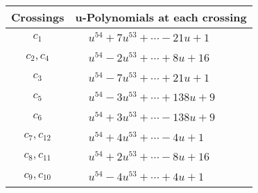 \documentclass[1p]{elsarticle_modified}
\theoremstyle{definition}
\begin{document}
\begin{tabular}{m{50pt}|m{274pt}}
Crossings & \hspace{64pt}u-Polynomials at each crossing \\
\hline $$\begin{aligned}c_{1}\end{aligned}$$&$\begin{aligned}
&u^{54}+7 u^{53}+\cdots-21 u+1
\end{aligned}$\\
\hline $$\begin{aligned}c_{2},c_{4}\end{aligned}$$&$\begin{aligned}
&u^{54}-2 u^{53}+\cdots+8 u+16
\end{aligned}$\\
\hline $$\begin{aligned}c_{3}\end{aligned}$$&$\begin{aligned}
&u^{54}-7 u^{53}+\cdots+21 u+1
\end{aligned}$\\
\hline $$\begin{aligned}c_{5}\end{aligned}$$&$\begin{aligned}
&u^{54}-3 u^{53}+\cdots+138 u+9
\end{aligned}$\\
\hline $$\begin{aligned}c_{6}\end{aligned}$$&$\begin{aligned}
&u^{54}+3 u^{53}+\cdots-138 u+9
\end{aligned}$\\
\hline $$\begin{aligned}c_{7},c_{12}\end{aligned}$$&$\begin{aligned}
&u^{54}+4 u^{53}+\cdots-4 u+1
\end{aligned}$\\
\hline $$\begin{aligned}c_{8},c_{11}\end{aligned}$$&$\begin{aligned}
&u^{54}+2 u^{53}+\cdots-8 u+16
\end{aligned}$\\
\hline $$\begin{aligned}c_{9},c_{10}\end{aligned}$$&$\begin{aligned}
&u^{54}-4 u^{53}+\cdots+4 u+1
\end{aligned}$\\
\hline
\end{tabular}\\~\\
\end{document}
